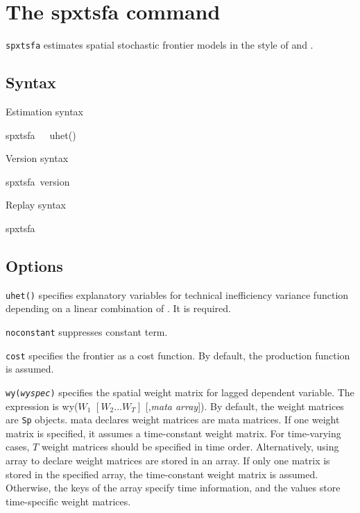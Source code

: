 
\section{The spxtsfa command}
{\tt spxtsfa} estimates spatial stochastic frontier models in the style of \cite{orea2019new} and \cite{galli2022spatial}.

\subsection{Syntax}

Estimation syntax

\begin{stsyntax}
	spxtsfa\
    \depvar\
    \optindepvars\,
	uhet(\varlist)
\end{stsyntax}



\noindent Version syntax

\begin{stsyntax}
	spxtsfa\,
	version
\end{stsyntax}


\noindent Replay syntax

\begin{stsyntax}
	spxtsfa\
\end{stsyntax}

\subsection{Options}

\hangpara
{\tt uhet(\varlist)} specifies explanatory variables for technical inefficiency variance  function depending on a linear combination of \varlist. It is required.

\hangpara
{\tt noconstant} suppresses constant term.

\hangpara
{\tt cost} specifies the frontier as a cost function. By default, the production function is assumed.

\hangpara
{\tt wy({\it wyspec})} specifies the spatial weight matrix for lagged dependent variable. The expression is wy($W_1$ $ [W_2 ... W_T]$ [,{\it mata array}]).  By default, the weight matrices are {\tt Sp} objects. mata declares weight matrices are mata matrices. If one weight matrix is specified, it assumes a time-constant weight matrix. For time-varying cases, $T$ weight matrices should be specified in time order. Alternatively, using array to declare weight matrices are stored in an array.  If only one matrix is stored in the specified array, the time-constant weight matrix is assumed.  Otherwise, the keys of the array specify time information, and the values store time-specific weight matrices.

